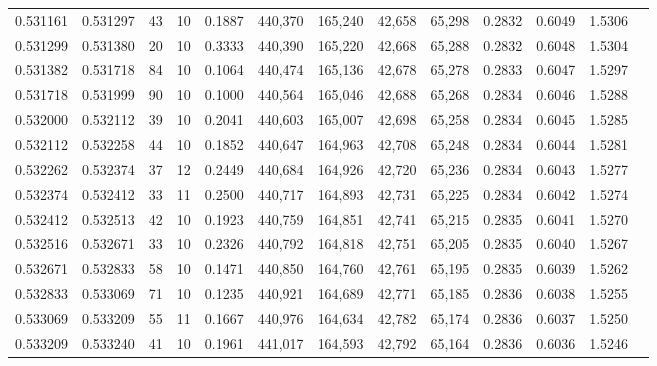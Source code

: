 \begin{tabular}{rrrrrrrrrrrrr}
0.531161 & 0.531297 &    43 &  10 &                                     0.1887 & 440,370 & 165,240 &  42,658 &  65,298 & 0.2832 & 0.6049 & 1.5306 \\
0.531299 & 0.531380 &    20 &  10 &                                     0.3333 & 440,390 & 165,220 &  42,668 &  65,288 & 0.2832 & 0.6048 & 1.5304 \\
0.531382 & 0.531718 &    84 &  10 &                                     0.1064 & 440,474 & 165,136 &  42,678 &  65,278 & 0.2833 & 0.6047 & 1.5297 \\
0.531718 & 0.531999 &    90 &  10 &                                     0.1000 & 440,564 & 165,046 &  42,688 &  65,268 & 0.2834 & 0.6046 & 1.5288 \\
0.532000 & 0.532112 &    39 &  10 &                                     0.2041 & 440,603 & 165,007 &  42,698 &  65,258 & 0.2834 & 0.6045 & 1.5285 \\
0.532112 & 0.532258 &    44 &  10 &                                     0.1852 & 440,647 & 164,963 &  42,708 &  65,248 & 0.2834 & 0.6044 & 1.5281 \\
0.532262 & 0.532374 &    37 &  12 &                                     0.2449 & 440,684 & 164,926 &  42,720 &  65,236 & 0.2834 & 0.6043 & 1.5277 \\
0.532374 & 0.532412 &    33 &  11 &                                     0.2500 & 440,717 & 164,893 &  42,731 &  65,225 & 0.2834 & 0.6042 & 1.5274 \\
0.532412 & 0.532513 &    42 &  10 &                                     0.1923 & 440,759 & 164,851 &  42,741 &  65,215 & 0.2835 & 0.6041 & 1.5270 \\
0.532516 & 0.532671 &    33 &  10 &                                     0.2326 & 440,792 & 164,818 &  42,751 &  65,205 & 0.2835 & 0.6040 & 1.5267 \\
0.532671 & 0.532833 &    58 &  10 &                                     0.1471 & 440,850 & 164,760 &  42,761 &  65,195 & 0.2835 & 0.6039 & 1.5262 \\
0.532833 & 0.533069 &    71 &  10 &                                     0.1235 & 440,921 & 164,689 &  42,771 &  65,185 & 0.2836 & 0.6038 & 1.5255 \\
0.533069 & 0.533209 &    55 &  11 &                                     0.1667 & 440,976 & 164,634 &  42,782 &  65,174 & 0.2836 & 0.6037 & 1.5250 \\
0.533209 & 0.533240 &    41 &  10 &                                     0.1961 & 441,017 & 164,593 &  42,792 &  65,164 & 0.2836 & 0.6036 & 1.5246 \\

\end{tabular}

